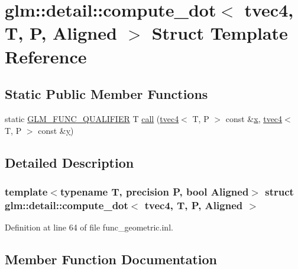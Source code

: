\hypertarget{structglm_1_1detail_1_1compute__dot_3_01tvec4_00_01_t_00_01_p_00_01_aligned_01_4}{}\section{glm\+::detail\+::compute\+\_\+dot$<$ tvec4, T, P, Aligned $>$ Struct Template Reference}
\label{structglm_1_1detail_1_1compute__dot_3_01tvec4_00_01_t_00_01_p_00_01_aligned_01_4}
\subsection*{Static Public Member Functions}
\begin{DoxyCompactItemize}
\item 
static \mbox{\hyperlink{setup_8hpp_a33fdea6f91c5f834105f7415e2a64407}{G\+L\+M\+\_\+\+F\+U\+N\+C\+\_\+\+Q\+U\+A\+L\+I\+F\+I\+ER}} T \mbox{\hyperlink{structglm_1_1detail_1_1compute__dot_3_01tvec4_00_01_t_00_01_p_00_01_aligned_01_4_a8b84c266bcc2ab21f1aba8a1c1c3bdf7}{call}} (\mbox{\hyperlink{structglm_1_1tvec4}{tvec4}}$<$ T, P $>$ const \&\mbox{\hyperlink{glad_8h_a92d0386e5c19fb81ea88c9f99644ab1d}{x}}, \mbox{\hyperlink{structglm_1_1tvec4}{tvec4}}$<$ T, P $>$ const \&\mbox{\hyperlink{glad_8h_a66ddd433d2cacfe27f5906b7e86faeed}{y}})
\end{DoxyCompactItemize}


\subsection{Detailed Description}
\subsubsection*{template$<$typename T, precision P, bool Aligned$>$\newline
struct glm\+::detail\+::compute\+\_\+dot$<$ tvec4, T, P, Aligned $>$}



Definition at line 64 of file func\+\_\+geometric.\+inl.



\subsection{Member Function Documentation}
\mbox{\label{structglm_1_1detail_1_1compute__dot_3_01tvec4_00_01_t_00_01_p_00_01_aligned_01_4_a8b84c266bcc2ab21f1aba8a1c1c3bdf7}} 
